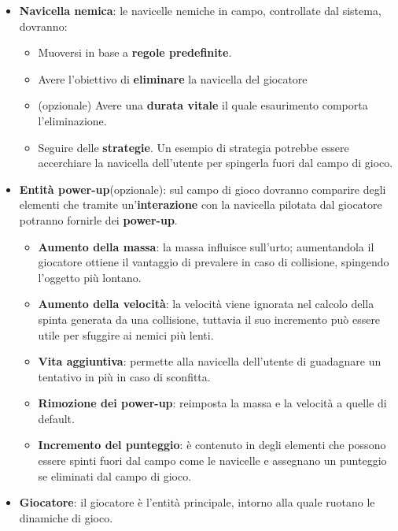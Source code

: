 \begin{itemize}
\begin{itemize}
                    \end{itemize}
                \item \textbf{Navicella nemica}: le navicelle nemiche in campo, controllate dal sistema, dovranno:
                \begin{itemize}
                    \item Muoversi in base a \textbf{regole predefinite}. 
                    \item Avere l'obiettivo di \textbf{eliminare} la navicella del giocatore
                    \item (opzionale) Avere una \textbf{durata vitale} il quale esaurimento comporta l'eliminazione.
                    \item Seguire delle \textbf{strategie}. Un esempio di strategia potrebbe essere accerchiare la navicella dell'utente per spingerla fuori dal campo di gioco.
                \end{itemize}
                \item \textbf{Entità power-up}(opzionale): sul campo di gioco dovranno comparire degli elementi che tramite un'\textbf{interazione} con la navicella pilotata dal giocatore potranno fornirle dei \textbf{power-up}. 
                    \begin{itemize}
                        \item \textbf{Aumento della massa}: la massa influisce sull'urto; aumentandola il giocatore ottiene il vantaggio di prevalere in caso di collisione, spingendo l'oggetto più lontano.
                        \item \textbf{Aumento della velocità}: la velocità viene ignorata nel calcolo della spinta generata da una collisione, tuttavia il suo incremento può essere utile per sfuggire ai nemici più lenti.
                        \item \textbf{Vita aggiuntiva}: permette alla navicella dell'utente di guadagnare un tentativo in più in caso di sconfitta.
                        \item \textbf{Rimozione dei power-up}: reimposta la massa e la velocità a quelle di default.
                        \item \textbf{Incremento del punteggio}: è contenuto in degli elementi che possono essere spinti fuori dal campo come le navicelle e assegnano un punteggio se eliminati dal campo di gioco.
                    \end{itemize}
                \item \textbf{Giocatore}: il giocatore è l'entità principale, intorno alla quale ruotano le dinamiche di gioco. 

\end{itemize}
